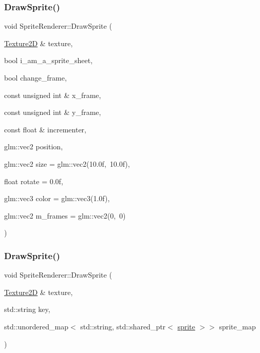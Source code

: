 \subsubsection{\texorpdfstring{Draw\+Sprite()}{DrawSprite()}\hspace{0.1cm}{\footnotesize\ttfamily [1/2]}}
{\footnotesize\ttfamily void Sprite\+Renderer\+::\+Draw\+Sprite (\begin{DoxyParamCaption}\item[{\hyperlink{classTexture2D}{Texture2D} \&}]{texture,  }\item[{bool}]{i\+\_\+am\+\_\+a\+\_\+sprite\+\_\+sheet,  }\item[{bool}]{change\+\_\+frame,  }\item[{const unsigned int \&}]{x\+\_\+frame,  }\item[{const unsigned int \&}]{y\+\_\+frame,  }\item[{const float \&}]{incrementer,  }\item[{glm\+::vec2}]{position,  }\item[{glm\+::vec2}]{size = {\ttfamily glm\+:\+:vec2(10.0f,~10.0f)},  }\item[{float}]{rotate = {\ttfamily 0.0f},  }\item[{glm\+::vec3}]{color = {\ttfamily glm\+:\+:vec3(1.0f)},  }\item[{glm\+::vec2}]{m\+\_\+frames = {\ttfamily glm\+:\+:vec2(0,~0)} }\end{DoxyParamCaption})}

\mbox{\label{classSpriteRenderer_aca1cf0c8ae37192f5d67662215eedf30}} 
\subsubsection{\texorpdfstring{Draw\+Sprite()}{DrawSprite()}\hspace{0.1cm}{\footnotesize\ttfamily [2/2]}}
{\footnotesize\ttfamily void Sprite\+Renderer\+::\+Draw\+Sprite (\begin{DoxyParamCaption}\item[{\hyperlink{classTexture2D}{Texture2D} \&}]{texture,  }\item[{std\+::string}]{key,  }\item[{std\+::unordered\+\_\+map$<$ std\+::string, std\+::shared\+\_\+ptr$<$ \hyperlink{classsprite}{sprite} $>$$>$}]{sprite\+\_\+map }\end{DoxyParamCaption})}

